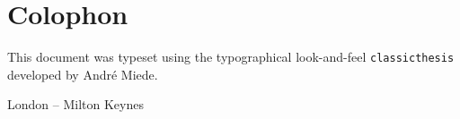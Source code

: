\pagestyle{empty}

\hfill

\vfill


\section*{Colophon}
This \Latex document was typeset using the typographical look-and-feel \texttt{classicthesis} developed by Andr\'e Miede. 

\begin{center}
London -- Milton Keynes
\end{center}
 
\bigskip

\noindent\finalVersionString


